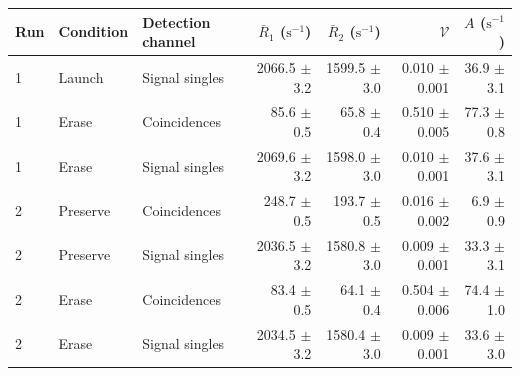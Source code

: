 \begin{tabular}{lllrrrr}
\toprule
Run & Condition & Detection channel & $\bar R_1$ ($\mathrm{s}^{-1}$) & $\bar R_2$ ($\mathrm{s}^{-1}$) & $\mathcal{V}$ & $A$ ($\mathrm{s}^{-1}$) \\
\midrule
1 & Launch & Signal singles & 2066.5 \ensuremath{\pm} 3.2 & 1599.5 \ensuremath{\pm} 3.0 & 0.010 \ensuremath{\pm} 0.001 & 36.9 \ensuremath{\pm} 3.1 \\
1 & Erase & Coincidences & 85.6 \ensuremath{\pm} 0.5 & 65.8 \ensuremath{\pm} 0.4 & 0.510 \ensuremath{\pm} 0.005 & 77.3 \ensuremath{\pm} 0.8 \\
1 & Erase & Signal singles & 2069.6 \ensuremath{\pm} 3.2 & 1598.0 \ensuremath{\pm} 3.0 & 0.010 \ensuremath{\pm} 0.001 & 37.6 \ensuremath{\pm} 3.1 \\
2 & Preserve & Coincidences & 248.7 \ensuremath{\pm} 0.5 & 193.7 \ensuremath{\pm} 0.5 & 0.016 \ensuremath{\pm} 0.002 & 6.9 \ensuremath{\pm} 0.9 \\
2 & Preserve & Signal singles & 2036.5 \ensuremath{\pm} 3.2 & 1580.8 \ensuremath{\pm} 3.0 & 0.009 \ensuremath{\pm} 0.001 & 33.3 \ensuremath{\pm} 3.1 \\
2 & Erase & Coincidences & 83.4 \ensuremath{\pm} 0.5 & 64.1 \ensuremath{\pm} 0.4 & 0.504 \ensuremath{\pm} 0.006 & 74.4 \ensuremath{\pm} 1.0 \\
2 & Erase & Signal singles & 2034.5 \ensuremath{\pm} 3.2 & 1580.4 \ensuremath{\pm} 3.0 & 0.009 \ensuremath{\pm} 0.001 & 33.6 \ensuremath{\pm} 3.0 \\
\bottomrule
\end{tabular}
